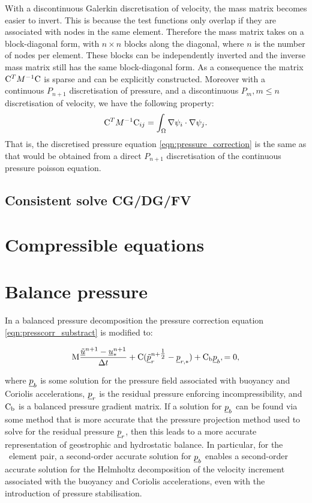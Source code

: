 With a discontinuous Galerkin discretisation of velocity, the mass matrix
becomes easier to invert. This is because the test functions only overlap
if they are associated with nodes in the same element. Therefore the mass
matrix takes on a block-diagonal form, with $n\times n$ blocks along
the diagonal, where $n$ is the number of nodes per element. These blocks
can be independently inverted and the inverse mass matrix still has the
same block-diagonal form. As a consequence the matrix
$\mathrm{C}^T M^{-1} \mathrm{C}$ is sparse and can be explicitly
constructed. Moreover with a continuous $P_{n+1}$ discretisation of pressure,
and a discontinuous $P_m, m\leq n$ discretisation of velocity, we
have the following property\citep{cotter2009}:
\begin{equation*}
  \mathrm{C}^T M^{-1} \mathrm{C}_{ij}=\int_\Omega \nabla \psi_i\cdot\nabla \psi_j.
\end{equation*}
That is, the discretised pressure equation \eqref{eqn:pressure_correction}
is the same as that would be obtained from a direct $P_{n+1}$
discretisation of the continuous pressure poisson equation.

\subsection{Consistent solve CG/DG/FV}

\section{Compressible equations}

\section{Balance pressure}
\label{Sect:balance_pressure}

In a balanced pressure decomposition the pressure correction equation \eqref{eqn:presscorr_substract}
is modified to:

\begin{equation}\label{eqn:bp_projection}
\mathrm{M}  \frac{{\underline{\tilde u}^{n+1}-\underline{u}_*^{n+1}}}{\Delta t}
    + \mathrm{C} ( \underline{\tilde p}_r^{n+\tfrac 12} - \underline{p}_{r,*}) + \mathrm{C_b} \underline{p}_b,
    =0,
\end{equation}

where $\underline{p}_b$ is some solution for the pressure field associated with buoyancy
and Coriolis accelerations, $\underline{p}_r$ is the residual pressure enforcing
incompressibility, and $\mathrm{C_b}$ is a balanced pressure
gradient matrix. If a solution for $\underline{p}_b$ can be found via some method that
is more accurate that the pressure projection method used to solve for the
residual pressure $\underline{p}_r$, then this leads to a more accurate representation of
geostrophic and hydrostatic balance. In particular, for the \Poo\
element pair, a second-order accurate solution
for $\underline{p}_b$ enables a second-order accurate solution for the Helmholtz decomposition
of the velocity increment associated with the buoyancy and Coriolis accelerations, even with the introduction of
pressure stabilisation.

